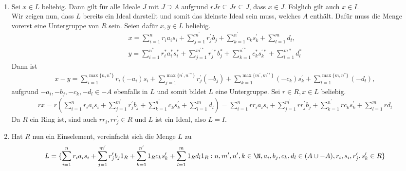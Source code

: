 \begin{solution}
\leavevmode \\
\begin{enumerate}[label = (\arabic*)]
  \item Sei $x \in L$ beliebig.
  Dann gilt für alle Ideale $J$ mit $J \supseteq A$ aufgrund $rJr \subseteq Jr \subseteq J$, dass $x \in J$.
  Folglich gilt auch $x \in I$. \\
  Wir zeigen nun, dass $L$ bereits ein Ideal darstellt
  und somit das kleinste Ideal sein muss, welches $A$ enthält.
  Dafür muss die Menge vorerst eine Untergruppe von $R$ sein. Seien dafür
  $x,y \in L$ beliebig.
  \begin{align*}
    x = \sum_{i = 1}^n r_ia_is_i + \sum_{j = 1}^{m^{\prime}}r_j^{\prime}b_j +
    \sum_{k = 1}^{n^{\prime}}c_ks_k^{\prime} + \sum_{l = 1}^{m}d_l, \\
    y = \sum_{i = 1}^{n^*} r_i^*a_i^*s_i^* + \sum_{j = 1}^{m^{\prime*}}r_j^{\prime*}b_j^* +
    \sum_{k = 1}^{n^{\prime*}}c_k^*s_k^{\prime*} + \sum_{l = 1}^{m*}d_l^*
  \end{align*}
  Dann ist
  \begin{align*}
    x - y = \sum_{i = 1}^{\max\{n,n^*\}} r_i(-a_i)s_i + \sum_{j = 1}^{\max\{n^{\prime},n^{\prime*}\}}r_j^{\prime}(-b_j) +
    \sum_{k = 1}^{\max\{m^{\prime},m^{\prime*}\}}(-c_k)s_k^{\prime} + \sum_{l = 1}^{\max\{m,n^*\}}(-d_l),
  \end{align*}
  aufgrund $-a_i, -b_j, -c_k, -d_l \in -A$ ebenfalls in $L$
  und somit bildet $L$ eine Untergruppe. Sei $r \in R, x \in L$ beliebig.
  \begin{align*}
    rx = r\left(\sum_{i = 1}^n r_ia_is_i + \sum_{j = 1}^{m^{\prime}}r_j^{\prime}b_j +
    \sum_{k = 1}^{n^{\prime}}c_ks_k^{\prime} + \sum_{l = 1}^{m}d_l\right)
    = \sum_{i = 1}^n rr_ia_is_i + \sum_{j = 1}^{m^{\prime}}rr_j^{\prime}b_j +
    \sum_{k = 1}^{n^{\prime}}rc_ks_k^{\prime} + \sum_{l = 1}^{m}rd_l
  \end{align*}
  Da $R$ ein Ring ist, sind auch $rr_i, rr_j^{\prime} \in R$ und $L$ ist ein Ideal, also $L = I$.
  \item Hat $R$ nun ein Einselement, vereinfacht sich die Menge $L$ zu
  \begin{align*}
  L &= \{\sum_{i = 1}^n r_ia_is_i + \sum_{j = 1}^{m^{\prime}}r_j^{\prime}b_j1_R +
  \sum_{k = 1}^{n^{\prime}}1_Rc_ks_k^{\prime} + \sum_{l = 1}^{m}1_Rd_l1_R :
  n,m^{\prime}, n^{\prime}, k \in \N, a_i, b_j, c_k, d_l \in (A \cup -A),
  r_i, s_i, r_j^{\prime}, s_k^{\prime} \in R \} \\

\end{align*}
\end{enumerate}
\end{solution}

